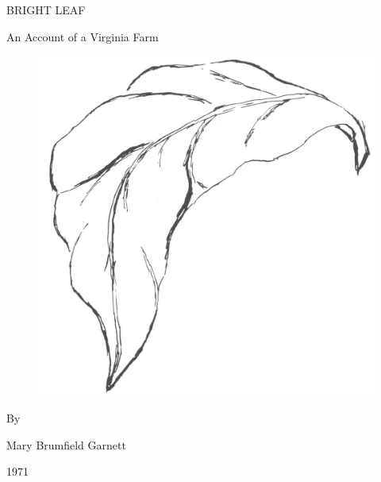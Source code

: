 \begin{titlingpage}
\vspace*{\droptitle}
\begin{center}
\Huge
BRIGHT LEAF
\end{center}

\begin{center}
\Huge
An Account of a Virginia Farm
\end{center}

\begin{figure}[h]
\centering
\includegraphics[width=1.0\textwidth]{leaf_sketch.jpg}
\end{figure}


\begin{center}
\Large
By
\end{center}
\begin{center}
\Large
Mary Brumfield Garnett
\end{center}
\begin{center}
\Large
1971
\end{center}


\end{titlingpage}
